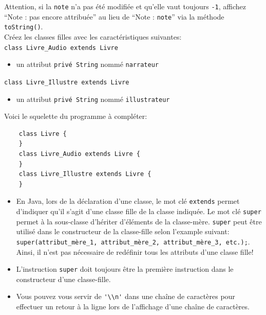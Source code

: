 \begin{Exercice}[20 minutes]
Attention, si la \lstinline{note} n'a pas été modifiée et qu'elle vaut toujours \lstinline{-1}, affichez ``Note : pas encore attribuée'' au lieu de ``Note : \lstinline{note}'' via la méthode \lstinline{toString()}. \\
Créez les classes filles avec les caractéristiques suivantes:\\
\lstinline{class Livre_Audio extends Livre}
\begin{itemize}
	\item un attribut \lstinline{privé String} nommé \lstinline{narrateur}
\end{itemize}
\lstinline{class Livre_Illustre extends Livre}
\begin{itemize}
	\item un attribut \lstinline{privé String} nommé \lstinline{illustrateur}
\end{itemize}
Voici le squelette du programme à compléter:
\begin{lstlisting}
	class Livre {
	}
	class Livre_Audio extends Livre {
	}
	class Livre_Illustre extends Livre {
	}\end{lstlisting}
\begin{conseil}
    \begin{itemize}
        \item En Java, lors de la déclaration d'une classe, le mot clé \lstinline{extends} permet d'indiquer qu'il s'agit d'une classe fille de la classe indiquée. 
        Le mot clé \lstinline{super} permet à la sous-classe d'hériter d'éléments de la classe-mère. \lstinline{super} peut être utilisé dans le constructeur de la classe-fille selon l'example suivant: \lstinline{super(attribut_mère_1, attribut_mère_2, attribut_mère_3, etc.);}. Ainsi, il n'est pas nécessaire de redéfinir tous les attributs d'une classe fille!
        \item L'instruction \lstinline{super} doit toujours être la première instruction dans le constructeur d'une classe-fille.
        \item Vous pouvez vous servir de \lstinline{'\\n'} dans une chaîne de caractères pour effectuer un retour à la ligne lors de l'affichage d'une chaîne de caractères.
    \end{itemize}
\end{conseil}
\begin{solution}
	
\end{solution}
\begin{solution}
    
\end{solution}
\begin{solution}
	
\end{solution}
\end{Exercice}
